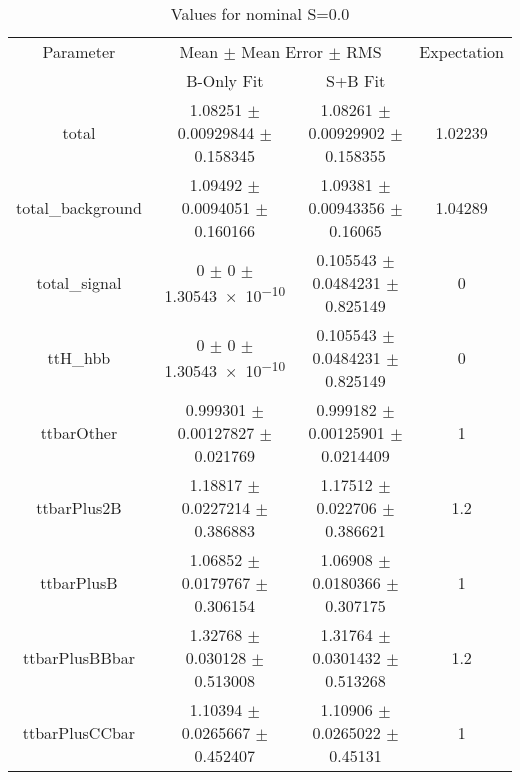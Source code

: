 \begin{table}
\centering
\caption{Values for nominal S=0.0}
\begin{tabular}{cccc}
\toprule
Parameter & \multicolumn{2}{c}{Mean $\pm$ Mean Error $\pm$ RMS} & Expectation\\
 & B-Only Fit & S+B Fit & \\
\midrule
total & \num{1.08251} $\pm$ \num{0.00929844} $\pm$ \num{0.158345} & \num{1.08261} $\pm$ \num{0.00929902} $\pm$ \num{0.158355} & \num{1.02239}\\
total\_background & \num{1.09492} $\pm$ \num{0.0094051} $\pm$ \num{0.160166} & \num{1.09381} $\pm$ \num{0.00943356} $\pm$ \num{0.16065} & \num{1.04289}\\
total\_signal & \num{0} $\pm$ \num{0} $\pm$ \num{1.30543e-10} & \num{0.105543} $\pm$ \num{0.0484231} $\pm$ \num{0.825149} & \num{0}\\
ttH\_hbb & \num{0} $\pm$ \num{0} $\pm$ \num{1.30543e-10} & \num{0.105543} $\pm$ \num{0.0484231} $\pm$ \num{0.825149} & \num{0}\\
ttbarOther & \num{0.999301} $\pm$ \num{0.00127827} $\pm$ \num{0.021769} & \num{0.999182} $\pm$ \num{0.00125901} $\pm$ \num{0.0214409} & \num{1}\\
ttbarPlus2B & \num{1.18817} $\pm$ \num{0.0227214} $\pm$ \num{0.386883} & \num{1.17512} $\pm$ \num{0.022706} $\pm$ \num{0.386621} & \num{1.2}\\
ttbarPlusB & \num{1.06852} $\pm$ \num{0.0179767} $\pm$ \num{0.306154} & \num{1.06908} $\pm$ \num{0.0180366} $\pm$ \num{0.307175} & \num{1}\\
ttbarPlusBBbar & \num{1.32768} $\pm$ \num{0.030128} $\pm$ \num{0.513008} & \num{1.31764} $\pm$ \num{0.0301432} $\pm$ \num{0.513268} & \num{1.2}\\
ttbarPlusCCbar & \num{1.10394} $\pm$ \num{0.0265667} $\pm$ \num{0.452407} & \num{1.10906} $\pm$ \num{0.0265022} $\pm$ \num{0.45131} & \num{1}\\
\bottomrule
\end{tabular}
\end{table}